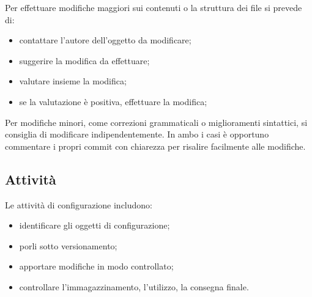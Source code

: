		Per effettuare modifiche maggiori sui contenuti o la struttura dei file si prevede di:
		\begin{itemize}
			\item contattare l'autore dell'oggetto da modificare;
			\item suggerire la modifica da effettuare;
			\item valutare insieme la modifica;
			\item se la valutazione è positiva, effettuare la modifica;
		\end{itemize}
		Per modifiche minori, come correzioni grammaticali o miglioramenti sintattici, si consiglia di modificare indipendentemente.\newline
		In ambo i casi è opportuno commentare i propri commit con chiarezza per risalire facilmente alle modifiche.
	\subsection{Attività}
	Le attività di configurazione includono:
	\begin{itemize}
		\item identificare gli oggetti di configurazione;
		\item porli sotto versionamento;
		\item apportare modifiche in modo controllato;
		\item controllare l'immagazzinamento, l'utilizzo, la consegna finale.
	\end{itemize}

